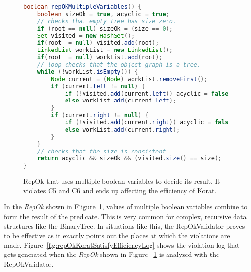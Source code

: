 \begin{figure}
\centering
\begin{lstlisting}[language=Java]
boolean repOKMultipleVariables() {
    boolean sizeOk = true, acyclic = true;
    // checks that empty tree has size zero.
    if (root == null) sizeOk = (size == 0);
    Set visited = new HashSet();
    if(root != null) visited.add(root);
    LinkedList workList = new LinkedList();
    if(root != null) workList.add(root);
    // loop checks that the object graph is a tree.
    while (!workList.isEmpty()) {
        Node current = (Node) workList.removeFirst();
        if (current.left != null) {
            if (!visited.add(current.left)) acyclic = false;
            else workList.add(current.left);
        }
        if (current.right != null) {
            if (!visited.add(current.right)) acyclic = false;
            else workList.add(current.right);
        }
    }
    // checks that the size is consistent.
    return acyclic && sizeOk && (visited.size() == size);  
}
\end{lstlisting}
\caption{RepOk that uses multiple boolean variables to decide its result. It violates C5 and C6 and ends up affecting the efficiency of Korat.}
\label{fig:repOkMultipleBooleanVariables}
\end{figure}

\para In the \emph{RepOk} shown in
F`igure~\ref{fig:repOkMultipleBooleanVariables}, values of multiple
boolean variables combine to form the result of the predicate. This is
very common for complex, recursive data structures like the
BinaryTree. In situations like this, the RepOkValidator proves to be
effective as it exactly points out the places at which the violations
are made. Figure~\ref{fig:repOkKoratSatisfyEfficiencyLog} shows the
violation log that gets generated when the \emph{RepOk} shown in
Figure~ \ref{fig:repOkMultipleBooleanVariables} is analyzed with the
RepOkValidator.


